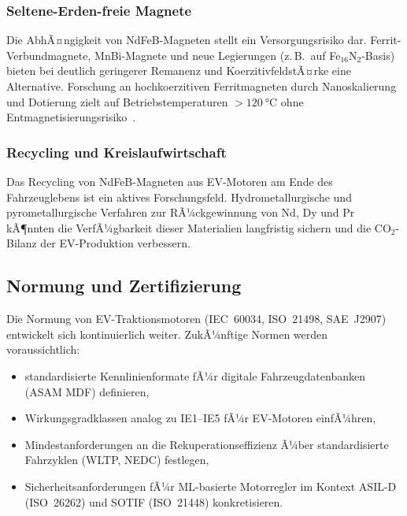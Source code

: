 ﻿\documentclass[a4paper,12pt]{article}
\theoremstyle{definition}
\begin{document}
\subsubsection{Seltene-Erden-freie Magnete}

Die AbhÃ¤ngigkeit von NdFeB-Magneten stellt ein Versorgungsrisiko dar.
Ferrit-Verbundmagnete, MnBi-Magnete und neue Legierungen (z.\,B.\ auf
Fe$_{16}$N$_2$-Basis) bieten bei deutlich geringerer Remanenz und
KoerzitivfeldstÃ¤rke eine Alternative. Forschung an hochkoerzitiven Ferritmagneten
durch Nanoskalierung und Dotierung zielt auf Betriebstemperaturen $>\SI{120}{\degreeCelsius}$
ohne Entmagnetisierungsrisiko~\cite{gutfleisch2011magnetic}.

\subsubsection{Recycling und Kreislaufwirtschaft}

Das Recycling von NdFeB-Magneten aus EV-Motoren am Ende des Fahrzeuglebens
ist ein aktives Forschungsfeld. Hydrometallurgische und pyrometallurgische
Verfahren zur RÃ¼ckgewinnung von Nd, Dy und Pr kÃ¶nnten die VerfÃ¼gbarkeit
dieser Materialien langfristig sichern und die $\mathrm{CO}_2$-Bilanz der
EV-Produktion verbessern.

\subsection{Normung und Zertifizierung}

Die Normung von EV-Traktionsmotoren (IEC~60034, ISO~21498, SAE~J2907) entwickelt
sich kontinuierlich weiter. ZukÃ¼nftige Normen werden voraussichtlich:
\begin{itemize}
    \item standardisierte Kennlinienformate fÃ¼r digitale Fahrzeugdatenbanken
          (ASAM MDF) definieren,
    \item Wirkungsgradklassen analog zu IE1--IE5 fÃ¼r EV-Motoren einfÃ¼hren,
    \item Mindestanforderungen an die Rekuperationseffizienz Ã¼ber standardisierte
          Fahrzyklen (WLTP, NEDC) festlegen,
    \item Sicherheitsanforderungen fÃ¼r ML-basierte Motorregler im Kontext
          ASIL-D (ISO~26262) und SOTIF (ISO~21448) konkretisieren.
\end{itemize}

\newpage
\end{document}
